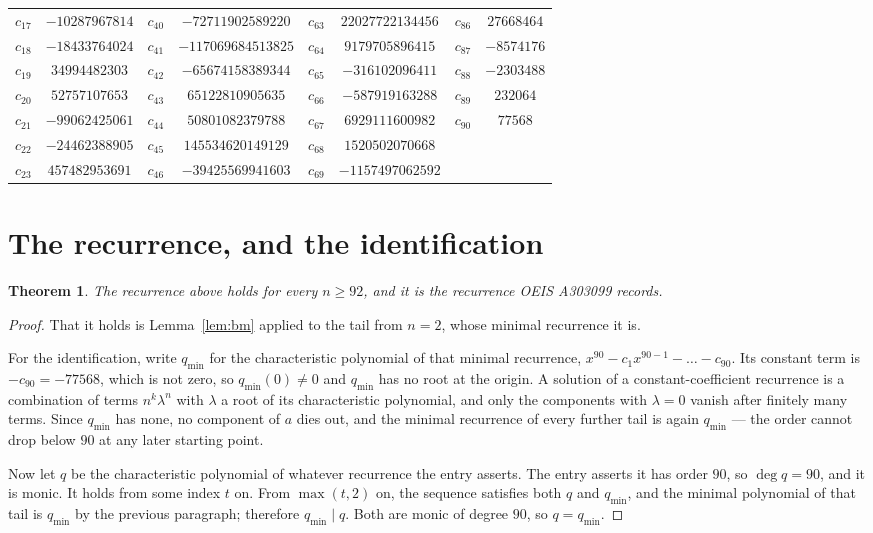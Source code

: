 \documentclass[11pt,a4paper]{article}
\theoremstyle{plain}
\newtheorem{theorem}{Theorem}
\theoremstyle{definition}
\begin{document}
\begin{center}
\begin{tabular}{cccccccc}
$c_{17}$ & $-10287967814$ & $c_{40}$ & $-72711902589220$ & $c_{63}$ & $22027722134456$ & $c_{86}$ & $27668464$ \\
$c_{18}$ & $-18433764024$ & $c_{41}$ & $-117069684513825$ & $c_{64}$ & $9179705896415$ & $c_{87}$ & $-8574176$ \\
$c_{19}$ & $34994482303$ & $c_{42}$ & $-65674158389344$ & $c_{65}$ & $-316102096411$ & $c_{88}$ & $-2303488$ \\
$c_{20}$ & $52757107653$ & $c_{43}$ & $65122810905635$ & $c_{66}$ & $-587919163288$ & $c_{89}$ & $232064$ \\
$c_{21}$ & $-99062425061$ & $c_{44}$ & $50801082379788$ & $c_{67}$ & $6929111600982$ & $c_{90}$ & $77568$ \\
$c_{22}$ & $-24462388905$ & $c_{45}$ & $145534620149129$ & $c_{68}$ & $1520502070668$ &  &  \\
$c_{23}$ & $457482953691$ & $c_{46}$ & $-39425569941603$ & $c_{69}$ & $-1157497062592$ &  &  \\
\end{tabular}
\end{center}

\section{The recurrence, and the identification}

\begin{theorem}
The recurrence above holds for every $n\ge92$, and it is the recurrence OEIS A303099 records.
\end{theorem}

\begin{proof}
That it holds is Lemma~\ref{lem:bm} applied to the tail from $n=2$, whose minimal
recurrence it is.

For the identification, write $q_{\min}$ for the characteristic polynomial of that minimal
recurrence, $x^{90}-c_1x^{90-1}-\dots-c_{90}$. Its constant term is
$-c_{90}=-77568$, which is not zero, so $q_{\min}(0)\neq0$ and $q_{\min}$ has no
root at the origin. A solution of a constant-coefficient recurrence is a combination of terms
$n^{k}\lambda^{n}$ with $\lambda$ a root of its characteristic polynomial, and only the
components with $\lambda=0$ vanish after finitely many terms. Since $q_{\min}$ has none, no
component of $a$ dies out, and the minimal recurrence of every further tail is again
$q_{\min}$ --- the order cannot drop below $90$ at any later starting point.

Now let $q$ be the characteristic polynomial of whatever recurrence the entry asserts. The
entry asserts it has order $90$, so $\deg q=90$, and it is monic. It holds from some
index $t$ on. From $\max(t,2)$ on, the sequence satisfies both $q$ and $q_{\min}$, and
the minimal polynomial of that tail is $q_{\min}$ by the previous paragraph; therefore
$q_{\min}\mid q$. Both are monic of degree $90$, so $q=q_{\min}$.
\end{proof}
\end{document}
